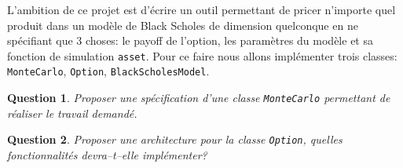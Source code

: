 \documentclass[a4paper,11pt]{article}
\def\var#1{{\tt #1}}
\newtheorem{question}{Question}
\begin{document}



L'ambition de ce projet est d'écrire un outil permettant de pricer n'importe
quel produit dans un modèle de Black Scholes de dimension quelconque en ne
spécifiant que 3 choses: le payoff de l'option, les paramètres du modèle et sa
fonction de simulation \texttt{asset}. Pour ce faire nous allons implémenter
trois classes: \verb!MonteCarlo!, \verb!Option!, \verb!BlackScholesModel!.

\begin{question}
  Proposer une spécification d'une classe \verb!MonteCarlo! permettant de
  réaliser le travail demandé.
\end{question}

\begin{question}
  Proposer une architecture pour la classe \verb!Option!, quelles
  fonctionnalités devra--t--elle implémenter?
\end{question}
\end{document}
